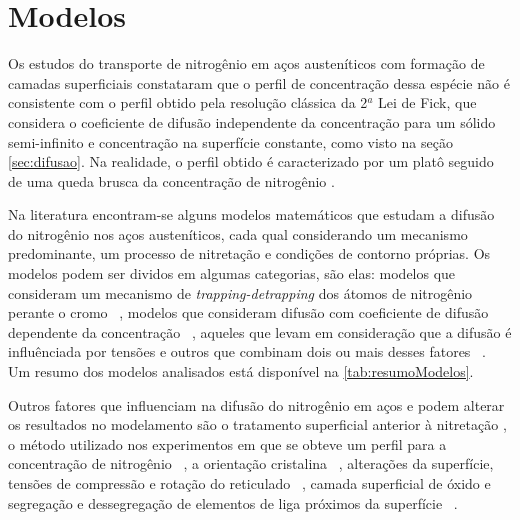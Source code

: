 \documentclass[]{politex}
\begin{document}
\section{Modelos}
	Os estudos do transporte de nitrogênio em aços austeníticos com formação de camadas superficiais constataram que o perfil de concentração dessa espécie não é consistente
	 com o perfil obtido pela resolução clássica da 2$^a$ Lei de Fick, que considera o coeficiente de difusão independente da concentração para um sólido semi-infinito e concentração na superfície constante, como visto na seção \autoref{sec:difusao}. Na realidade, o perfil obtido é caracterizado por um platô seguido de uma queda brusca da concentração de nitrogênio \cite{parascandola2000nitrogen}. \par
	Na literatura encontram-se alguns modelos matemáticos que estudam a difusão do nitrogênio nos aços austeníticos, cada qual considerando um mecanismo predominante, um processo de nitretação e condições de contorno próprias. Os modelos podem ser dividos em algumas categorias, são elas: modelos que consideram um mecanismo de \textit{trapping-detrapping} dos átomos de nitrogênio perante o cromo ~\cite{parascandola2000nitrogen, moller2001surface, moskalioviene2011modeling}, modelos que consideram difusão com coeficiente de difusão dependente da concentração ~\cite{mandl2002concentration, mandl2003nitrogen}, aqueles que levam em consideração que a difusão é influênciada por tensões \cite{galdikas2010stress} e outros que combinam dois ou mais desses fatores ~\cite{christiansen2008nitrogen, moskalioviene2012stress}. Um resumo dos modelos analisados está disponível na \autoref{tab:resumoModelos}.\par
	Outros fatores que influenciam na difusão do nitrogênio em aços e podem alterar os resultados no modelamento são o tratamento superficial anterior à nitretação \cite{baranowska2010importance}, o método utilizado nos experimentos em que se obteve um perfil para a concentração de nitrogênio ~\cite{moskalioviene2011modeling}, a orientação cristalina ~\cite{moskalioviene2011modeling}, alterações da superfície, tensões de compressão e rotação do reticulado  ~\cite{moskalioviene2011modeling}, camada superficial de óxido e segregação e dessegregação de elementos de liga próximos da superfície ~\cite{mandl2002concentration}.
	
\end{document}
